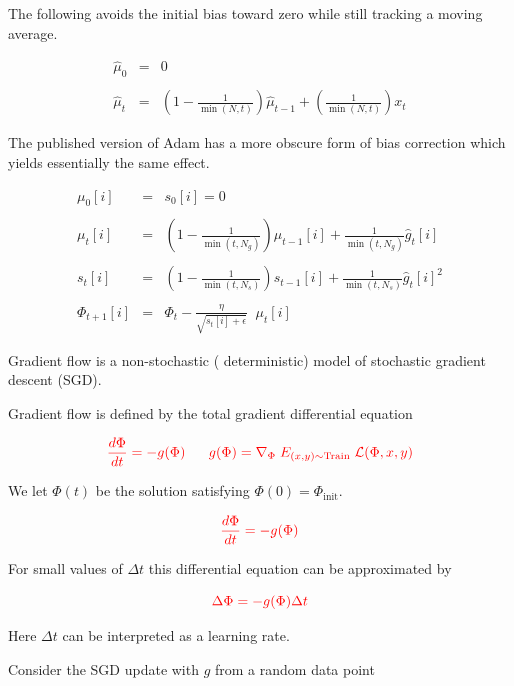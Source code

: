 {The following avoids the initial bias toward zero while still tracking a moving average.

\begin{eqnarray*}
\hat{\mu}_0 & = & 0 \\
\\
\hat{\mu}_t & = & \left(1-\frac{1}{\min(N,t)}\right)\hat{\mu}_{t-1} + \left(\frac{1}{\min(N,t)}\right)x_t
\end{eqnarray*}

\vfill
The published version of Adam has a more obscure form of bias correction which yields essentially the same effect.


\begin{eqnarray*}
  \mu_0[i] & = & s_0[i] = 0 \\
  \\
  \mu_{t}[i] & = & \left(1-\frac{1}{\min(t,N_g)}\right)\mu_{t-1}[i] + \frac{1}{\min(t,N_g)} \hat{g}_t[i] \\
  \\
  s_{t}[i] & = & \left(1-\frac{1}{\min(t,N_s)}\right)s_{t-1}[i] + \frac{1}{\min(t,N_s)} \hat{g}_t[i]^2 \\
  \\
\Phi_{t+1}[i] & =  & \Phi_t - \frac{\eta}{\sqrt{s_{t}[i] + \epsilon}}\;\;\mu_{t}[i]
\end{eqnarray*}


Gradient flow is a non-stochastic ({\color{red} deterministic}) model of {\color{red} stochastic} gradient descent (SGD).

\vfill
Gradient flow is defined by the {\color{red} total gradient} differential equation

$${\color{red} \frac{d \Phi}{d t} = - g(\Phi) \;\;\;\;\;\; g(\Phi) = \nabla_\Phi\; E_{(x,y) \sim \mathrm{Train}}\;{\cal L}(\Phi,x,y)}$$

\vfill
We let $\Phi(t)$ be the solution satisfying $\Phi(0) = \Phi_{\mathrm{init}}$.

$${\color{red} \frac{d \Phi}{d t} = - g(\Phi)}$$

\vfill
For small values of $\Delta t$ this differential equation can be approximated by

\vfill
$${\color{red} \Delta \Phi = - g(\Phi)\Delta t}$$

\vfill
Here $\Delta t$ can be interpreted as a learning rate.

Consider the SGD update with $\hat{g}$ from a random data point


}
